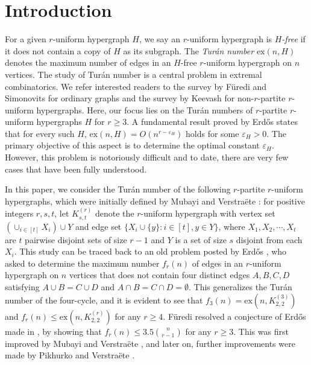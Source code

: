 \documentclass[11pt]{article}
\def\ex{\mathrm{ex}}
\begin{document}
\section{Introduction}
For a given $r$-uniform hypergraph $H$, we say an $r$-uniform hypergraph is {\it $H$-free} if it does not contain a copy of $H$ as its subgraph.
The {\it Tur\'an number} $\ex(n,H)$ denotes the maximum number of edges in an $H$-free $r$-uniform hypergraph on $n$ vertices.
The study of Tur\'an number is a central problem in extremal combinatorics.
We refer interested readers to the survey by F\"uredi and Simonovits \cite{FS-survey} for ordinary graphs and
the survey by Keevash \cite{Kv11} for non-$r$-partite $r$-uniform hypergraphs.
Here, our focus lies on the Tur\'an numbers of $r$-partite $r$-uniform hypergraphs $H$ for $r\geq 3$.
A fundamental result proved by Erd\H{o}s states that for every such $H$,
$\ex(n,H)=O(n^{r-\varepsilon_H})$ holds for some $\varepsilon_H>0$.
The primary objective of this aspect is to determine the optimal constant $\varepsilon_H$.
However, this problem is notoriously difficult and to date, there are very few cases that have been fully understood.

In this paper, we consider the Tur\'an number of the following $r$-partite $r$-uniform hypergraphs,
which were initially defined by Mubayi and Verstra\"ete \cite{MuVe04}:
for positive integers $r,s,t$, let $K^{(r)}_{s,t}$ denote the $r$-uniform hypergraph with vertex set $\left(\cup_{i\in [t]}X_i\right)\cup Y$ and edge set $\{X_i\cup \{y\}: i\in [t], y\in Y\}$,
where $X_1,X_2,\cdots,X_t$ are $t$ pairwise disjoint sets of size $r-1$ and $Y$ is a set of size $s$ disjoint from each $X_i$.
This study can be traced back to an old problem posted by Erd\H{o}s \cite{E77},
who asked to determine the maximum number $f_r(n)$ of edges in an $r$-uniform hypergraph on $n$ vertices that does not contain four distinct edges
$A, B, C, D$ satisfying $A\cup B=C\cup D$ and $A\cap B=C\cap D=\emptyset$.
This generalizes the Tur\'an number of the four-cycle, and it is evident to see that $f_3(n)=\ex(n,K^{(3)}_{2,2})$ and $f_r(n)\le \ex(n,K^{(r)}_{2,2})$ for any $r\geq 4$.
F\"uredi \cite{Fu84} resolved a conjecture of Erd\H{o}s made in \cite{E77}, by showing that $f_r(n)\leq 3.5\binom{n}{r-1}$ for any $r\geq 3$.
This was first improved by Mubayi and Verstra\"ete \cite{MuVe04}, and later on,
further improvements were made by Pikhurko and Verstra\"ete \cite{PiVe09}.
\end{document}
